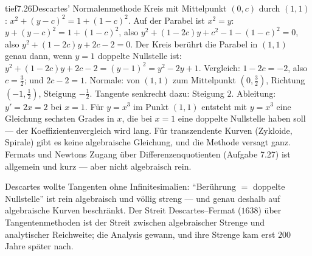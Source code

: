 \begin{loesungkarte}{tief}{7.26}{Descartes' Normalenmethode}
Kreis mit Mittelpunkt $(0, c)$ durch $(1, 1)$: $x^{2} + (y - c)^{2} = 1 + (1 - c)^{2}$. Auf der Parabel ist $x^{2} = y$: $y + (y - c)^{2} = 1 + (1 - c)^{2}$, also $y^{2} + (1 - 2c)y + c^{2} - 1 - (1 - c)^{2} = 0$, also $y^{2} + (1 - 2c)y + 2c - 2 = 0$.
Der Kreis berührt die Parabel in $(1, 1)$ genau dann, wenn $y = 1$ doppelte Nullstelle ist: $y^{2} + (1 - 2c)y + 2c - 2 = (y - 1)^{2} = y^{2} - 2y + 1$. Vergleich: $1 - 2c = -2$, also $c = \frac32$; und $2c - 2 = 1$. \checkmark
{}
Normale: von $(1, 1)$ zum Mittelpunkt $(0, \frac32)$, Richtung $(-1, \frac12)$, Steigung $-\frac12$. Tangente senkrecht dazu: Steigung $2$. Ableitung: $y' = 2x = 2$ bei $x = 1$. \checkmark
{}
Für $y = x^{3}$ im Punkt $(1, 1)$ entsteht mit $y = x^{3}$ eine Gleichung sechsten Grades in $x$, die bei $x = 1$ eine doppelte Nullstelle haben soll --- der Koeffizientenvergleich wird lang. Für transzendente Kurven (Zykloide, Spirale) gibt es keine algebraische Gleichung, und die Methode versagt ganz. Fermats und Newtons Zugang über Differenzenquotienten (Aufgabe 7.27) ist allgemein und kurz --- aber nicht algebraisch rein.
\begin{mitnehmen}\kastentext
Descartes wollte Tangenten ohne Infinitesimalien: \enquote{Berührung $=$ doppelte Nullstelle} ist rein algebraisch und völlig streng --- und genau deshalb auf algebraische Kurven beschränkt. Der Streit Descartes--Fermat ($1638$) über Tangentenmethoden ist der Streit zwischen algebraischer Strenge und analytischer Reichweite; die Analysis gewann, und ihre Strenge kam erst $200$ Jahre später nach.
\end{mitnehmen}
\end{loesungkarte}

